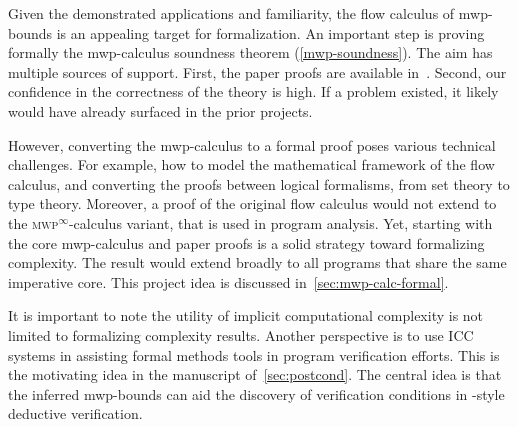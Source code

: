 Given the demonstrated applications and familiarity, the flow calculus of
mwp-bounds is an appealing target for formalization. An
important step is proving formally the mwp-calculus soundness
theorem (\autoref{mwp-soundness}). The aim has
multiple sources of support. First, the paper proofs are available
in~\cite{jones2009}. Second, our confidence in the correctness of the theory is
high. If a problem existed, it likely would have already surfaced in the prior
projects.

However, converting the mwp-calculus to a formal proof poses various technical
challenges. For example, how to model the mathematical framework of the flow
calculus, and converting the proofs between logical formalisms, from set theory
to type theory. Moreover, a proof of the original flow calculus would not extend
to the \textsc{mwp}$^\infty$-calculus variant, that is used in
program analysis. Yet, starting with the core mwp-calculus and paper proofs is a
solid strategy toward formalizing complexity. The result would extend broadly to
all programs that share the same imperative core. This project idea is discussed
in~\autoref{sec:mwp-calc-formal}.

It is important to note the utility of implicit computational complexity is not
limited to formalizing complexity results. Another perspective is to use ICC
systems in assisting formal methods tools in program verification efforts. This
is the motivating idea in the manuscript of~\autoref{sec:postcond}. The central
idea is that the inferred mwp-bounds can aid the discovery of verification
conditions in -style deductive verification.
